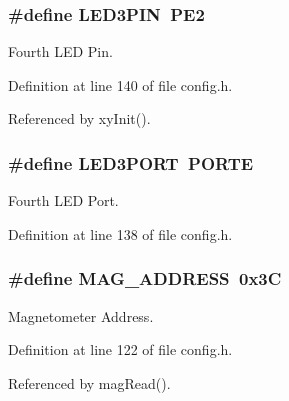 \hypertarget{group__config_ga2663b8fc01c4753562adc572cf12a5ed}{
\subsubsection[{L\-E\-D3\-P\-I\-N}]{\setlength{\rightskip}{0pt plus 5cm}\#define L\-E\-D3\-P\-I\-N~P\-E2}}\label{group__config_ga2663b8fc01c4753562adc572cf12a5ed}


Fourth L\-E\-D Pin. 



Definition at line 140 of file config.\-h.



Referenced by xy\-Init().

\hypertarget{group__config_ga63df95c1a0ce0e770964ca35e4032fb6}{
\subsubsection[{L\-E\-D3\-P\-O\-R\-T}]{\setlength{\rightskip}{0pt plus 5cm}\#define L\-E\-D3\-P\-O\-R\-T~P\-O\-R\-T\-E}}\label{group__config_ga63df95c1a0ce0e770964ca35e4032fb6}


Fourth L\-E\-D Port. 



Definition at line 138 of file config.\-h.

\hypertarget{group__config_gade4e63fac819c67040e374f08d2d7230}{
\subsubsection[{M\-A\-G\-\_\-\-A\-D\-D\-R\-E\-S\-S}]{\setlength{\rightskip}{0pt plus 5cm}\#define M\-A\-G\-\_\-\-A\-D\-D\-R\-E\-S\-S~0x3\-C}}\label{group__config_gade4e63fac819c67040e374f08d2d7230}


Magnetometer Address. 



Definition at line 122 of file config.\-h.



Referenced by mag\-Read().

